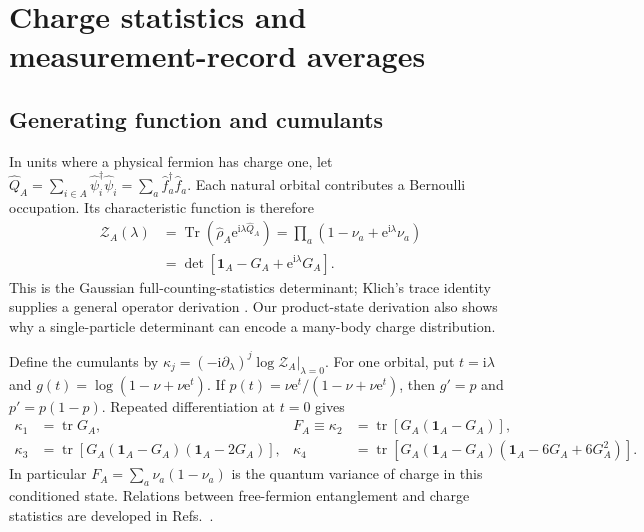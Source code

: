\documentclass[aps,prb,onecolumn,nofootinbib,superscriptaddress]{revtex4-2}
\newcommand{\Id}{\mathbf{1}}
\newcommand{\Tr}{\operatorname{Tr}}
\newcommand{\tr}{\operatorname{tr}}
\newcommand{\ii}{\mathrm{i}}
\newcommand{\e}{\mathrm{e}}
\begin{document}
\section{Charge statistics and measurement-record averages}
\label{sec:fcs}
\subsection{Generating function and cumulants}
In units where a physical fermion has charge one, let
$\hat Q_A=\sum_{i\in A}\hat\psi_i^\dagger\hat\psi_i
=\sum_a\hat f_a^\dagger\hat f_a$. Each natural orbital contributes a
Bernoulli occupation. Its characteristic function is therefore
\begin{align}
 \mathcal Z_A(\lambda)
 &=\Tr(\hat\rho_A\e^{\ii\lambda\hat Q_A})
 =\prod_a(1-\nu_a+\e^{\ii\lambda}\nu_a)\\
 &=\det[\Id_A-G_A+\e^{\ii\lambda}G_A].
 \label{eq:fcs}
\end{align}
This is the Gaussian full-counting-statistics determinant; Klich's trace
identity supplies a general operator derivation \cite{Klich2003}.
Our product-state derivation also shows why a single-particle determinant
can encode a many-body charge distribution.

Define the cumulants by
$\kappa_j=(-\ii\partial_\lambda)^j\log\mathcal Z_A|_{\lambda=0}$.
For one orbital, put $t=\ii\lambda$ and
$g(t)=\log(1-\nu+\nu\e^t)$. If
$p(t)=\nu\e^t/(1-\nu+\nu\e^t)$, then
$g'=p$ and $p'=p(1-p)$. Repeated differentiation at $t=0$ gives
\begin{align}
 \kappa_1&=\tr G_A,&
 F_A\equiv\kappa_2&=\tr[G_A(\Id_A-G_A)],\nonumber\\
 \kappa_3&=\tr[G_A(\Id_A-G_A)(\Id_A-2G_A)],&
 \kappa_4&=\tr[G_A(\Id_A-G_A)(\Id_A-6G_A+6G_A^2)].
 \label{eq:cumulants}
\end{align}
In particular $F_A=\sum_a\nu_a(1-\nu_a)$ is the quantum variance of
charge in this conditioned state. Relations between free-fermion
entanglement and charge statistics are developed in
Refs.~\cite{KlichLevitov2009,SongFlindtRachel2011,SongRachelFlindtKlichLaflorencieLeHur2012}.
\end{document}
